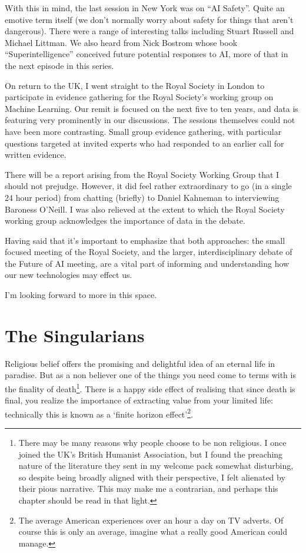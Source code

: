 \documentclass[a4paper]{caesar_book}
\let\oldchapter\chapter
\def\chapter{%
  \setcounter{footnote}{0}%
  \oldchapter
}
\begin{document}
With this in mind, the last session in New York was on “AI Safety”. Quite an emotive term itself (we don’t normally worry about safety for things that aren't dangerous). There were a range of interesting talks including Stuart Russell and Michael Littman. We also heard from Nick Bostrom whose book “Superintelligence” conceived future potential responses to AI, more of that in the next episode in this series.

On return to the UK, I went straight to the Royal Society in London to participate in evidence gathering for the Royal Society’s working group on Machine Learning. Our remit is focused on the next five to ten years, and data is featuring very prominently in our discussions. The sessions themselves could not have been more contrasting. Small group evidence gathering, with particular questions targeted at invited experts who had responded to an earlier call for written evidence.

There will be a report arising from the Royal Society Working Group that I should not prejudge. However, it did feel rather extraordinary to go (in a single 24 hour period) from chatting (briefly) to Daniel Kahneman to interviewing Baroness O’Neill. I was also relieved at the extent to which the Royal Society working group acknowledges the importance of data in the debate.

Having said that it’s important to emphasize that both approaches: the small focused meeting of the Royal Society, and the larger, interdisciplinary debate of the Future of AI meeting, are a vital part of informing and understanding how our new technologies may effect us.

I’m looking forward to more in this space.

\chapter{The Singularians}

Religious belief offers the promising and delightful idea of an eternal life in paradise. But as a non believer one of the things you need come to terms with is the finality of death\footnote{There may be many reasons why people choose to be non religious. I once joined the UK’s British Humanist Association, but I found the preaching nature of the literature they sent in my welcome pack somewhat disturbing, so despite being broadly aligned with their perspective, I felt alienated by their pious narrative. This may make me a contrarian, and perhaps this chapter should be read in that light.}. There is a happy side effect of realising that since death is final, you realize the importance of extracting value from your limited life: technically this is known as a ‘finite horizon effect’\footnote{The average American experiences over an hour a day on TV adverts. Of course this is only an average, imagine what a really good American could manage.}.
\end{document}
